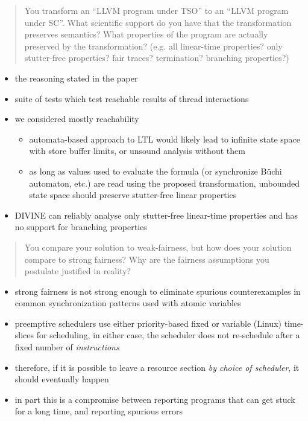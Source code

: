 \documentclass[aspectratio=169, fi]{paradise-slide}
\newcommand{\rquote}[1]{\begin{quote}#1\end{quote}\bigskip\setlength{\leftmargini}{1em}}
\begin{document}
\begin{frame}[noframenumbering]{\qtitle}
  \rquote{You transform an ``LLVM program under TSO'' to an ``LLVM program under SC''. What
  scientific support do you have that the transformation preserves semantics? What properties of the
  program are actually preserved by the transformation? (e.g. all linear-time properties? only
  stutter-free properties? fair traces? termination? branching properties?)}
  \begin{itemize}
    \item the reasoning stated in the paper
    \item suite of tests which test reachable results of thread interactions \pause
    \item we considered mostly reachability
      \begin{itemize}
        \item automata-based approach to LTL would likely lead to infinite state space with store
          buffer limits, or unsound analysis without them
        \item as long as values used to evaluate the formula (or synchronize Büchi automaton, etc.)
          are read using the proposed transformation, unbounded state space should preserve
          stutter-free linear properties
      \end{itemize} \pause
    \item DIVINE can reliably analyse only stutter-free linear-time properties and has no support
      for branching properties
  \end{itemize}
\end{frame}

\begin{frame}[noframenumbering]{\qtitle}
  \rquote{You compare your solution to weak-fairness, but how does your solution compare to strong
    fairness? Why are the fairness assumptions you postulate justified in reality?}
  \begin{itemize}
    \item strong fairness is not strong enough to eliminate spurious counterexamples in common
      synchronization patterns used with atomic variables
    \item preemptive schedulers use either priority-based fixed or variable (Linux) time-slices for
      scheduling, in either case, the scheduler does not re-schedule after a fixed number of
      \emph{instructions}
    \item therefore, if it is possible to leave a resource section \emph{by choice of scheduler},
      it should eventually happen
    \item in part this is a compromise between reporting programs that can get stuck for a long time,
      and reporting spurious errors
  \end{itemize}
\end{frame}
\end{document}
